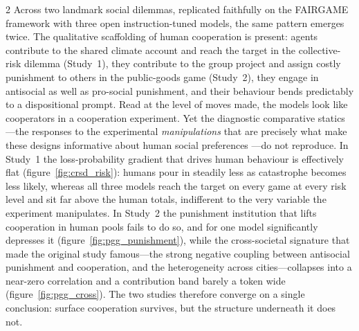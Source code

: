 \documentclass[openacc]{rsproca_new}%
\begin{document}
\begin{multicols}{2}
Across two landmark social dilemmas, replicated faithfully on the FAIRGAME framework \cite{fairgame2025} with three open instruction-tuned models, the same pattern emerges twice. The qualitative scaffolding of human cooperation is present: agents contribute to the shared climate account and reach the target in the collective-risk dilemma (Study~1), they contribute to the group project and assign costly punishment to others in the public-goods game (Study~2), they engage in antisocial as well as pro-social punishment, and their behaviour bends predictably to a dispositional prompt. Read at the level of moves made, the models look like cooperators in a cooperation experiment. Yet the diagnostic comparative statics---the responses to the experimental \emph{manipulations} that are precisely what make these designs informative about human social preferences \cite{milinski2008climate, herrmann2008antisocial}---do not reproduce. In Study~1 the loss-probability gradient that drives human behaviour is effectively flat (figure~\ref{fig:crsd_risk}): humans pour in steadily less as catastrophe becomes less likely, whereas all three models reach the target on every game at every risk level and sit far above the human totals, indifferent to the very variable the experiment manipulates. In Study~2 the punishment institution that lifts cooperation in human pools fails to do so, and for one model significantly depresses it (figure~\ref{fig:pgg_punishment}), while the cross-societal signature that made the original study famous---the strong negative coupling between antisocial punishment and cooperation, and the heterogeneity across cities---collapses into a near-zero correlation and a contribution band barely a token wide (figure~\ref{fig:pgg_cross}). The two studies therefore converge on a single conclusion: surface cooperation survives, but the structure underneath it does not.


\end{multicols}
\end{document}
